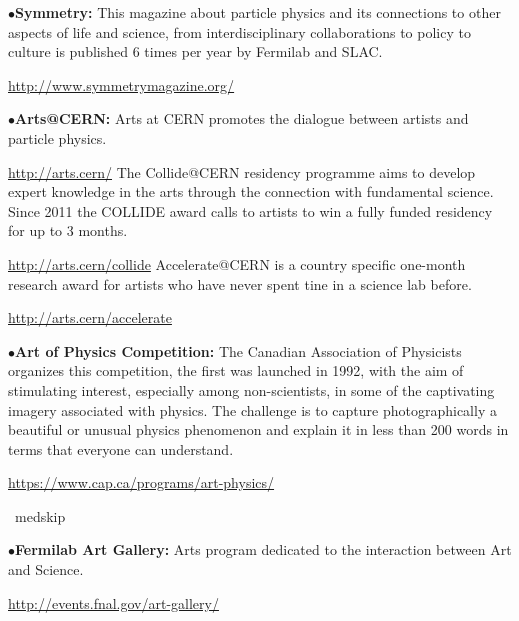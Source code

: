 \medskip

\item{$\bullet$}{\bf Symmetry:}
This magazine about particle physics and its connections to other aspects of life and science, from interdisciplinary collaborations to policy to culture is published 6 times per year by Fermilab and SLAC.
     \item{}\qquad\url{http://www.symmetrymagazine.org/}
     \item{}

\medskip
\medskip





\medskip

\item{$\bullet$}{\bf Arts@CERN:} 
Arts at CERN promotes the dialogue between artists and particle physics.
	\item{}\qquad\url{http://arts.cern/}
The Collide@CERN residency programme aims to develop expert knowledge in the arts through the connection with fundamental science. Since 2011 the COLLIDE award calls to artists to win a fully funded residency for up to 3 months.
	\item{}\qquad\url{http://arts.cern/collide}
Accelerate@CERN is a country specific one-month research award for artists who have never spent tine in a science lab before.
	\item{}\qquad\url{http://arts.cern/accelerate}


\medskip

\item{$\bullet$}{\bf Art of Physics Competition:}
The Canadian Association of Physicists organizes this competition, the first was launched in 1992, with the aim of stimulating interest, especially among non-scientists, in some of the captivating imagery associated with physics. The challenge is to capture photographically a beautiful or unusual physics phenomenon and explain it in less than 200 words in terms that everyone can understand.
	\item{}\qquad\url{https://www.cap.ca/programs/art-physics/}

\ medskip

\item{$\bullet$}{\bf Fermilab Art Gallery:}
Arts program dedicated to the interaction between Art and Science.
	\item{}\qquad\url{http://events.fnal.gov/art-gallery/}


